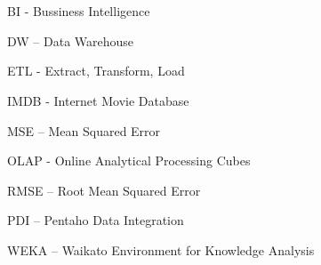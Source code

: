 \section*{} 
BI - Bussiness Intelligence

DW	–  	Data Warehouse

ETL - Extract, Transform, Load

IMDB - Internet Movie Database

MSE    –   Mean Squared Error

OLAP - Online Analytical Processing Cubes

RMSE    –   Root Mean Squared Error

PDI	– 	Pentaho Data Integration 

WEKA	–	Waikato Environment for Knowledge Analysis